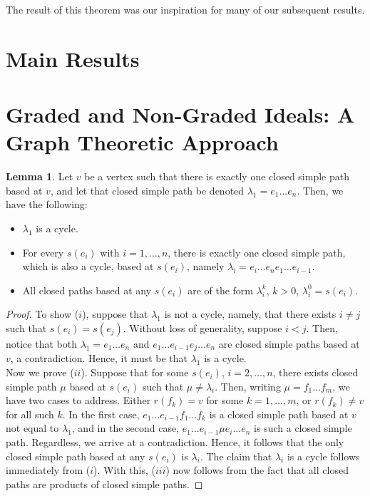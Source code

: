 \documentclass[12pt]{amsart}
\theoremstyle{plain} \numberwithin{equation}{section}
\theoremstyle{definition}
\newtheorem{lem}[theorem]{Lemma}
\theoremstyle{definition}
\begin{document}
The result of this theorem was our inspiration for many of our subsequent results.

\section{\textbf{Main Results}}

\section*{Graded and Non-Graded Ideals: A Graph Theoretic Approach}
\begin{lem}\label{3.1}
    Let $v$ be a vertex such that there is exactly one closed simple path based at $v$, and let that closed simple path be denoted $\lambda_1 = e_1\dots e_n$. Then, we have the following:
    \begin{itemize}
        \item [($i$)] $\lambda_1$ is a cycle.
        \item [($ii$)] For every $s(e_i)$ with $i = 1,\dots ,n$, there is exactly one closed simple path, which is also a cycle, based at $s(e_i)$, namely $\lambda_i = e_i\dots e_ne_1\dots e_{i-1}$. 
        \item[($iii$)] All closed paths based at any $s(e_i)$ are of the form $\lambda_i^k$, $k > 0$, $\lambda_i^0 = s(e_i)$.
    \end{itemize}
\end{lem}
\begin{proof}
    To show ($i$), suppose that $\lambda_1$ is not a cycle, namely, that there exists $i\neq j$ such that $s(e_i) = s(e_j)$. Without loss of generality, suppose $i<j$. Then, notice that both $\lambda_1 = e_1\dots e_n$ and $e_1\dots e_{i-1}e_j\dots e_n$ are closed simple paths based at $v$, a contradiction. Hence, it must be that $\lambda_1$ is a cycle. \\
    Now we prove ($ii$). Suppose that for some $s(e_i)$, $i = 2,\dots ,n$, there exists closed simple path $\mu$ based at $s(e_i)$ such that $\mu\neq\lambda_i$. Then, writing $\mu = f_1\dots f_m$, we have two cases to address. Either $r(f_k) = v$ for some $k = 1,\dots, m$, or $r(f_k) \neq v$ for all such $k$. In the first case, $e_1 \dots e_{i - 1} f_1 \dots f_k$ is a closed simple path based at $v$ not equal to $\lambda_1$, and in the second case, $e_1\dots e_{i-1}\mu e_i\dots e_n$ is such a closed simple path. Regardless, we arrive at a contradiction. Hence, it follows that the only closed simple path based at any $s(e_i)$ is $\lambda_i$. The claim that $\lambda_i$ is a cycle follows immediately from ($i$). With this, ($iii$) now follows from the fact that all closed paths are products of closed simple paths.
\end{proof}
\end{document}
